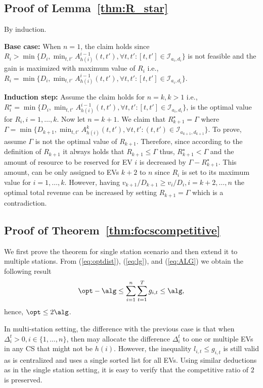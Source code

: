 \subsection{Proof of Lemma~\ref{thm:R_star}}
			\label{app:3}
			By induction.
			
			\textbf{Base case:} When $n=1$, the claim holds since $R_i>\min\{D_i, \min_{t,t'} A^{i-1}_{h(i)}(t,t'), \forall t,t': [t,t']\in\mathcal{I}_{a_i,d_i}\}$ is not feasible and the gain is maximized with maximum value of $R_i$ i.e., $R_i=\min\{D_i, \min_{t,t'} A^{i-1}_{h(i)}(t,t'), \forall t,t': [t,t']\in\mathcal{I}_{a_i,d_i}\}$.
			
			\textbf{Induction step:} Assume the claim holds for $n=k, k>1$ i.e., $R_i^\star=\min\{D_i, \min_{t,t'} A^{i-1}_{h(i)}(t,t'), \forall t,t': [t,t']\in\mathcal{I}_{a_i,d_i}\}$, is the optimal value for $R_i, i=1,\dots ,k$. Now let $n=k+1$. We claim that $R^\star  _{k+1}=\Gamma$ where  $\Gamma =\min\{D_{k+1}, \min_{t,t'} A^{k}_{h(i)}(t,t'), \forall t,t': (t,t')\in\mathcal{I}_{a_{k+1},d_{k+1}}\}$. To prove, assume $\Gamma$ is not the optimal value of $R_{k+1}$. Therefore, since according to the definition of $R_{k+1}$ it always holds that $R _{k+1}\leq\Gamma$ thus, $R^\star _{k+1}<\Gamma$ and the amount of resource to be reserved for EV $i$ is decreased by $\Gamma - R^\star _{k+1}$. This amount, can be only assigned to EVs $k+2$ to $n$ since $R_i$ is set to its maximum value for $i=1,\dots , k$. However, having $v_{k+1}\slash D_{k+1}\geq v_{i}\slash D_{i}, i=k+2,\dots ,n$ the optimal total revenue can be increased by setting $R_{k+1}=\Gamma$ which is a contradiction.
	
	
\subsection{Proof of Theorem~\ref{thm:focscompetitive}}
	\label{app:focscompetitive}
	
	We first prove the theorem for single station scenario and then extend it to multiple stations. From (\ref{eq:optdist}), (\ref{eq:lg}), and (\ref{eq:ALG}) we obtain the following result
\begin{equation}
\label{eq:compsingle}
\opt-\alg\leq \sum_{i=1}^n\sum_{t=1}^Tg_{i,t}\leq\alg,
\end{equation}
hence, $\opt\leq 2\alg$. 

In multi-station setting, the difference with the previous case is that when $\Delta_{i}^t>0, i\in\{1,\dots,n\}$, then \focs may allocate the difference $\Delta_{i}^t$ to one or multiple EVs in any CS that might not be $h(i)$. However, the inequality $l_{i,t}\leq g_{i,t}$ is still valid as \focs is centralized and uses a single sorted list for all EVs. Using similar deductions as in the single station setting, it is easy to verify that the competitive ratio of $2$ is preserved.
		
